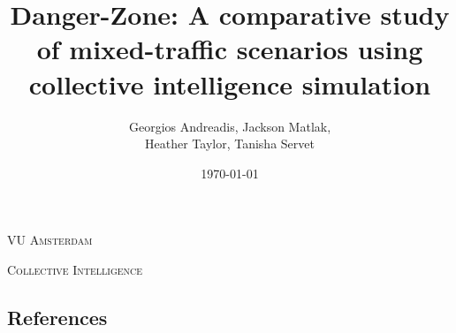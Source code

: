 \documentclass[12pt,a4paper]{report}
\title{Danger-Zone: A comparative study of mixed-traffic scenarios using collective intelligence simulation}
\author{
Georgios Andreadis, Jackson Matlak,\\
Heather Taylor, Tanisha Servet
}
\date{\today}
\begin{document}
    \begin{titlepage}
        \centering

        {\scshape\LARGE VU Amsterdam \par}
        \vspace{1cm}
        {\scshape\Large Collective Intelligence\par}
        \vspace{5cm}

        {\huge\bfseries\sffamily \thetitle \par}
        \par\vspace{1cm}
        {\Large\itshape \theauthor \par}

        \vfill

        {\large \thedate \par}
    \end{titlepage}

    
    \tableofcontents
    
    
    
    
    
    
    

    \begin{appendices}
        \chapter{References}
        \printbibliography[heading=none]
        
    \end{appendices}
\end{document}
